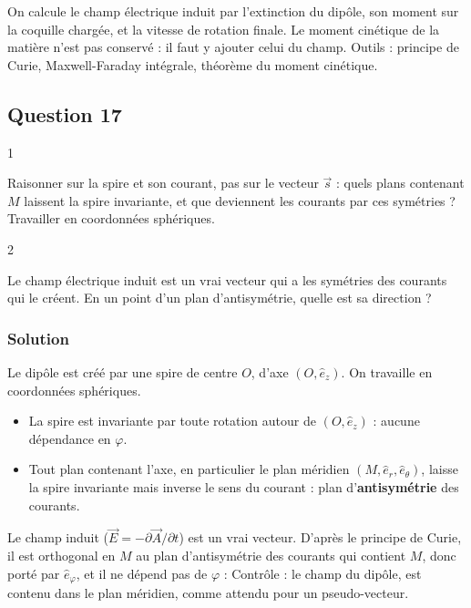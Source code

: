 \documentclass[11pt,a4paper]{article}
\providecommand{\tightlist}{\setlength{\itemsep}{0pt}\setlength{\parskip}{0pt}}
\newcommand{\equationajustee}[1]{%
  \sbox{\boiteequation}{$\displaystyle #1$}%
  \ifdim\wd\boiteequation>\linewidth
    \[\resizebox{\linewidth}{!}{\usebox{\boiteequation}}\]%
  \else
    \[#1\]%
  \fi}
\begin{document}
On calcule le champ électrique induit par l'extinction du dipôle, son moment sur la coquille chargée, et la vitesse de rotation finale. Le moment cinétique de la matière n'est pas conservé : il faut y ajouter celui du champ. Outils : principe de Curie, Maxwell-Faraday intégrale, théorème du moment cinétique.

\hypertarget{question-17}{%
\subsection{Question 17}\label{question-17}}

\begin{indication}{1}

Raisonner sur la spire et son courant, pas sur le vecteur \(\vec s\) : quels plans contenant \(M\) laissent la spire invariante, et que deviennent les courants par ces symétries ? Travailler en coordonnées sphériques.

\end{indication}

\begin{indication}{2}

Le champ électrique induit est un vrai vecteur qui a les symétries des courants qui le créent. En un point d'un plan d'antisymétrie, quelle est sa direction ?

\end{indication}

\hypertarget{solution-16}{%
\subsubsection{Solution}\label{solution-16}}

Le dipôle est créé par une spire de centre \(O\), d'axe \((O,\hat e_z)\). On travaille en coordonnées sphériques.

\begin{itemize}
\tightlist
\item
  La spire est invariante par toute rotation autour de \((O,\hat e_z)\) : aucune dépendance en \(\varphi\).
\item
  Tout plan contenant l'axe, en particulier le plan méridien \((M,\hat e_r,\hat e_\theta)\), laisse la spire invariante mais inverse le sens du courant : plan d'\textbf{antisymétrie} des courants.
\end{itemize}

Le champ induit (\(\vec E=-\partial\vec A/\partial t\)) est un vrai vecteur. D'après le principe de Curie, il est orthogonal en \(M\) au plan d'antisymétrie des courants qui contient \(M\), donc porté par \(\hat e_\varphi\), et il ne dépend pas de \(\varphi\) :
\equationajustee{\boxed{\vec E(M,t)=E_\varphi(r,\theta,t)\,\hat e_\varphi}}
Contrôle : le champ du dipôle,
\equationajustee{\vec B=\frac{\mu_0s}{4\pi r^3}\left(2\cos\theta\,\hat e_r+\sin\theta\,\hat e_\theta\right),}
est contenu dans le plan méridien, comme attendu pour un pseudo-vecteur.
\end{document}
